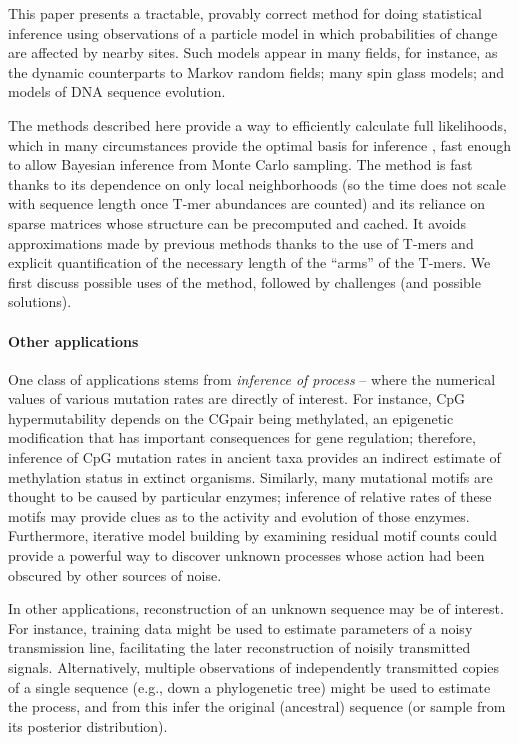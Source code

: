 \documentclass{article}
\newcommand{\nC}{\mbox{C}}
\newcommand{\nG}{\mbox{G}}
\theoremstyle{plain}
\theoremstyle{definition}
\begin{document}
This paper presents a tractable, provably correct method
for doing statistical inference using observations of a particle model
in which probabilities of change are affected by nearby sites.
Such models appear in many fields, for instance,
as the dynamic counterparts to Markov random fields;
many spin glass models;
and models of DNA sequence evolution.

The methods described here provide a way to efficiently calculate full likelihoods,
which in many circumstances provide the optimal basis for inference \citep{neyman1933problem},
fast enough to allow Bayesian inference from Monte Carlo sampling.
The method is fast thanks to its dependence on only local neighborhoods
(so the time does not scale with sequence length once T-mer abundances are counted)
and its reliance on sparse matrices whose structure can be precomputed and cached.
It avoids approximations made by previous methods thanks to the use of T-mers
and explicit quantification of the necessary length of the ``arms'' of the T-mers.
We first discuss possible uses of the method,
followed by challenges (and possible solutions).


\paragraph{Other applications}
One class of applications stems from \emph{inference of process} --
where the numerical values of various mutation rates are directly of interest.
For instance, CpG hypermutability depends on the \nC\nG pair being methylated,
an epigenetic modification that has important consequences for gene regulation;
therefore, inference of CpG mutation rates in ancient taxa provides an indirect estimate
of methylation status in extinct organisms.
Similarly, many mutational motifs are thought to be caused by particular enzymes;
inference of relative rates of these motifs
may provide clues as to the activity and evolution of those enzymes.
Furthermore, iterative model building by examining residual motif counts
could provide a powerful way to discover unknown processes
whose action had been obscured by other sources of noise.

In other applications, reconstruction of an unknown sequence may be of interest.
For instance, training data might be used to estimate parameters of a noisy transmission line,
facilitating the later reconstruction of noisily transmitted signals.
Alternatively, multiple observations of independently transmitted copies of a single sequence
(e.g., down a phylogenetic tree)
might be used to estimate the process, and from this infer the original (ancestral) sequence
(or sample from its posterior distribution).
\end{document}
